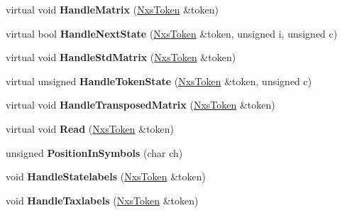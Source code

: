 \begin{DoxyCompactItemize}
\item 
\hypertarget{classNxsCharactersBlock_ac3182cda60e8ecb7bf6fbef6abe187ee}{
virtual void {\bfseries HandleMatrix} (\hyperlink{classNxsToken}{NxsToken} \&token)}
\label{classNxsCharactersBlock_ac3182cda60e8ecb7bf6fbef6abe187ee}

\item 
\hypertarget{classNxsCharactersBlock_ab5a639cfe3cecacf98fbf21232507fd8}{
virtual bool {\bfseries HandleNextState} (\hyperlink{classNxsToken}{NxsToken} \&token, unsigned i, unsigned c)}
\label{classNxsCharactersBlock_ab5a639cfe3cecacf98fbf21232507fd8}

\item 
\hypertarget{classNxsCharactersBlock_afa4e2954e61ccdfaafda0609d294d729}{
virtual void {\bfseries HandleStdMatrix} (\hyperlink{classNxsToken}{NxsToken} \&token)}
\label{classNxsCharactersBlock_afa4e2954e61ccdfaafda0609d294d729}

\item 
\hypertarget{classNxsCharactersBlock_aa9ee838c740babd226c917f716a281da}{
virtual unsigned {\bfseries HandleTokenState} (\hyperlink{classNxsToken}{NxsToken} \&token, unsigned c)}
\label{classNxsCharactersBlock_aa9ee838c740babd226c917f716a281da}

\item 
\hypertarget{classNxsCharactersBlock_ad1e6cab805c606e17d5d57b2e5e36b50}{
virtual void {\bfseries HandleTransposedMatrix} (\hyperlink{classNxsToken}{NxsToken} \&token)}
\label{classNxsCharactersBlock_ad1e6cab805c606e17d5d57b2e5e36b50}

\item 
\hypertarget{classNxsCharactersBlock_af13ecbcad48d15bcade4eb44875644dd}{
virtual void {\bfseries Read} (\hyperlink{classNxsToken}{NxsToken} \&token)}
\label{classNxsCharactersBlock_af13ecbcad48d15bcade4eb44875644dd}

\item 
\hypertarget{classNxsCharactersBlock_a6b1936d89a877e42178d00543a322c02}{
unsigned {\bfseries PositionInSymbols} (char ch)}
\label{classNxsCharactersBlock_a6b1936d89a877e42178d00543a322c02}

\item 
\hypertarget{classNxsCharactersBlock_ae52c5cc8b8e1a8473be02c9a1ec63dfc}{
void {\bfseries HandleStatelabels} (\hyperlink{classNxsToken}{NxsToken} \&token)}
\label{classNxsCharactersBlock_ae52c5cc8b8e1a8473be02c9a1ec63dfc}

\item 
\hypertarget{classNxsCharactersBlock_a41f8b6956a6556e9cc5fd1d68bb834e7}{
void {\bfseries HandleTaxlabels} (\hyperlink{classNxsToken}{NxsToken} \&token)}
\label{classNxsCharactersBlock_a41f8b6956a6556e9cc5fd1d68bb834e7}


\end{DoxyCompactItemize}
